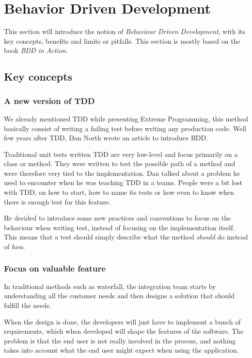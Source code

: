 \section{Behavior Driven Development}\label{sec:bdd}

This section will introduce the notion of \textit{Behaviour Driven
Development}, with its key concepts, benefits and limits or pitfalls.
This section is mostly based on the book \textit{BDD in Action}.

\subsection{Key concepts}\label{subsec:bdd-key-concepts}

\subsubsection{A new version of TDD}
We already mentioned TDD while presenting Extreme Programming, this method
basically consist of writing a failing test before writing any production code.
Well few years after TDD, Dan North wrote an article to introduce BDD\@.

Traditional unit tests written TDD are very low-level and focus primarily on
a class or method.
They were written to test the possible path of a method and were therefore very
tied to the implementation.
Dan talked about a problem he used to encounter when he was teaching TDD in
a teams.
People were a bit lost with TDD, on how to start, how to name its tests or how
even to know when there is enough test for this feature.

He decided to introduce some new practices and conventions to focus on the
behaviour when writing test, instead of focusing on the implementation itself.
This means that a test should simply describe what the method \textit{should}
do instead of \textit{how}.

\subsubsection{Focus on valuable feature}
In traditional methods such as waterfall, the integration team starts by
understanding all the customer needs and then designs a solution that should
fulfill the needs.

When the design is done, the developers will just have to implement a bunch
of requirements, which when developed will shape the features of the software.
The problem is that the end user is not really involved in the process, and
nothing takes into account what the end user might expect when using the
application.

